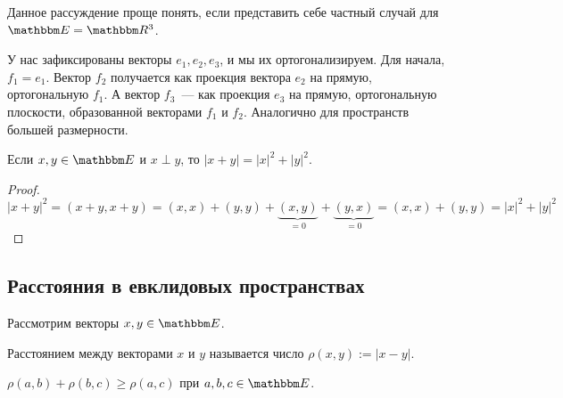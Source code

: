 \begin{Examples}
Данное рассуждение проще понять, если представить себе частный случай для $\E = \R^3$.

У нас зафиксированы векторы $e_1, e_2, e_3$, и мы их ортогонализируем. Для начала, $f_1 = e_1$. Вектор $f_2$ получается как проекция вектора $e_2$ на прямую, ортогональную $f_1$. А вектор $f_3$~--- как проекция $e_3$ на прямую, ортогональную плоскости, образованной векторами $f_1$ и $f_2$. Аналогично для пространств большей размерности.
\end{Examples}

\begin{Theorem}[Пифагора]
Если $x, y \in \E$ и $x \perp y$, то $|x+y| = |x|^2 + |y|^2$.
\end{Theorem}

\begin{proof}
	$$|x + y|^2 = (x+y, x+y) = (x, x) + (y, y) + \underbrace{(x, y)}_{=0} + \underbrace{(y, x)}_{=0} = (x, x) + (y, y) = |x|^2 + |y|^2$$
\end{proof}

\subsection*{Расстояния в евклидовых пространствах}

Рассмотрим векторы $x, y \in \E$.
\begin{Def}
	Расстоянием между векторами $x$ и $y$ называется число $\rho(x,y) := |x-y|$.
\end{Def}

\begin{Suggestion}
	$\rho(a,b) + \rho(b,c) \geqslant \rho(a,c)$ при $a, b, c \in \E$.
\end{Suggestion}

